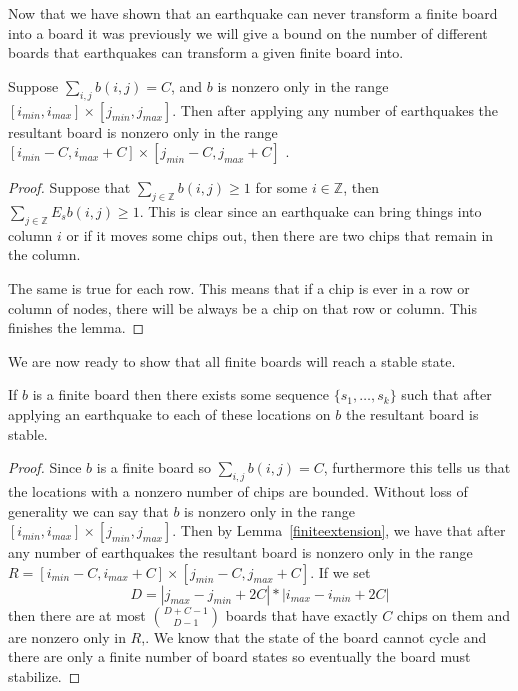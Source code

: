 \documentclass[runningheads,a4paper]{llncs}
\begin{document}
Now that we have shown that an earthquake can never transform a finite board into a board it was previously we will give a bound on the number of different boards that earthquakes can transform a given finite board into.
\begin{lemma}
\label{finiteextension}
Suppose $\sum_{i,j} b(i,j) = C$, and $b$ is nonzero only in the range $[i_{min}, i_{max}] \times [j_{min}, j_{max}]$. Then after applying any number of earthquakes the resultant board is nonzero only in the range $[i_{min}-C, i_{max}+C] \times [j_{min}-C, j_{max}+C]$ .
\end{lemma}

\begin{proof}
Suppose that $\sum_{j\in \mathbb{Z}} b(i,j) \geq 1$ for some $i \in \mathbb{Z}$, then $\sum_{j \in \mathbb{Z}} E_{s}b(i,j) \geq 1$. This is clear since an earthquake can bring things into column $i$ or if it moves some chips out, then there are two chips that remain in the column.

The same is true for each row. This means that if a chip  is ever in a row or column of nodes, there will be always be a chip on that row or column. This finishes the lemma. 
\end{proof}

We are now ready to show that all finite boards will reach a stable state. 

\begin{theorem} If $b$ is a finite board then there exists some sequence $\{s_1, \ldots, s_k\}$ such that after applying an earthquake to each of these locations on $b$ the resultant board is stable. 
\end{theorem}
\begin{proof}
 Since $b$ is a finite board so $\sum_{i,j} b(i,j) = C$, furthermore this tells us that the locations with a nonzero number of chips are bounded.  Without loss of generality we can say that $b$ is nonzero only in the range $[i_{min}, i_{max}] \times [j_{min}, j_{max}]$. Then by Lemma~\ref{finiteextension}, we have that after any number of earthquakes the resultant board is nonzero only in the range $ R=[i_{min}-C, i_{max}+C] \times [j_{min}-C, j_{max}+C]$. If we set 
\begin{equation*}
D= |j_{max}-j_{min} + 2C|*|i_{max} - i_{min} + 2C|
\end{equation*}
then there are at most  $\binom{D+C-1}{D-1}$  boards that have exactly $C$ chips on them and are nonzero only in $R$,. We know that the state of the board cannot cycle and there are only a finite number of board states so eventually the board must stabilize.
\end{proof}
\end{document}
